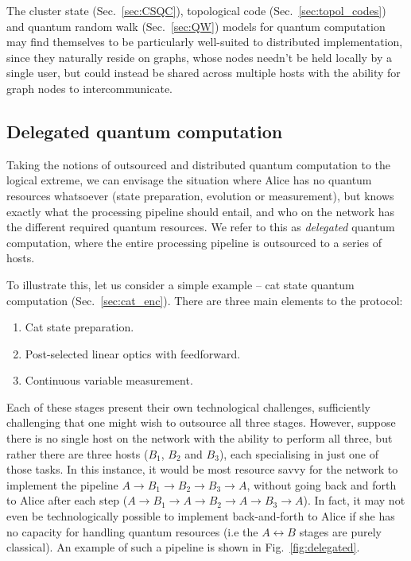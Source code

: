 \documentclass[aps,rmp,twocolumn,amsmath,amssymb,nofootinbib,superscriptaddress,longbibliography,floatfix,table-of-contents,eqsecnum]{revtex4-1}
\begin{document}
The cluster state (Sec.~\ref{sec:CSQC}), topological code (Sec.~\ref{sec:topol_codes}) and quantum random walk (Sec.~\ref{sec:QW}) models for quantum computation may find themselves to be particularly well-suited to distributed implementation, since they naturally reside on graphs, whose nodes needn't be held locally by a single user, but could instead be shared across multiple hosts with the ability for graph nodes to intercommunicate.

%
%

\subsection{Delegated quantum computation} 

Taking the notions of outsourced and distributed quantum computation to the logical extreme, we can envisage the situation where Alice has no quantum resources whatsoever (state preparation, evolution or measurement), but knows exactly what the processing pipeline should entail, and who on the network has the different required quantum resources. We refer to this as \textit{delegated} quantum computation, where the entire processing pipeline is outsourced to a series of hosts.

To illustrate this, let us consider a simple example -- cat state quantum computation (Sec.~\ref{sec:cat_enc}). There are three main elements to the protocol:
\begin{enumerate}
\item Cat state preparation.
\item Post-selected linear optics with feedforward.
\item Continuous variable measurement.
\end{enumerate}

Each of these stages present their own technological challenges, sufficiently challenging that one might wish to outsource all three stages. However, suppose there is no single host on the network with the ability to perform all three, but rather there are three hosts ($B_1$, $B_2$ and $B_3$), each specialising in just one of those tasks. In this instance, it would be most resource savvy for the network to implement the pipeline \mbox{$A\to B_1\to B_2\to B_3\to A$}, without going back and forth to Alice after each step (\mbox{$A\to B_1\to A\to B_2 \to A\to B_3\to A$}). In fact, it may not even be technologically possible to implement back-and-forth to Alice if she has no capacity for handling quantum resources (i.e the \mbox{$A\leftrightarrow B$} stages are purely classical). An example of such a pipeline is shown in Fig.~\ref{fig:delegated}.
\end{document}
